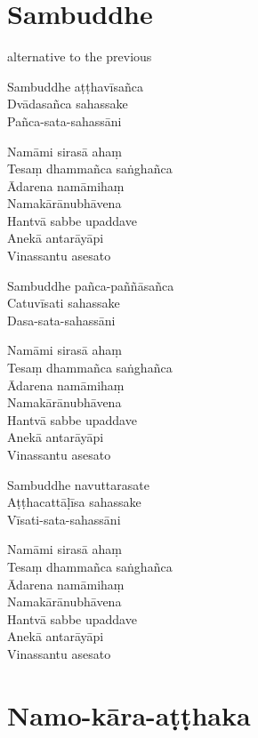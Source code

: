 \chapter{Sambuddhe}%

\begin{paritta}
\begin{instruction}
alternative to the previous
\end{instruction}

Sambuddhe aṭṭhavīsañca\\
Dvādasañca sahassake\\
Pañca-sata-sahassāni

Namāmi sirasā ahaṃ\\
Tesaṃ dhammañca saṅghañca\\
Ādarena namāmihaṃ\\
Namakārānubhāvena\\
Hantvā sabbe upaddave\\
Anekā antarāyāpi\\
Vinassantu asesato

\clearpage

Sambuddhe pañca-paññāsañca\\
Catuvīsati sahassake\\
Dasa-sata-sahassāni

Namāmi sirasā ahaṃ\\
Tesaṃ dhammañca saṅghañca\\
Ādarena namāmihaṃ\\
Namakārānubhāvena\\
Hantvā sabbe upaddave\\
Anekā antarāyāpi\\
Vinassantu asesato

Sambuddhe navuttarasate\\
Aṭṭhacattāḷīsa sahassake\\
Vīsati-sata-sahassāni

Namāmi sirasā ahaṃ\\
Tesaṃ dhammañca saṅghañca\\
Ādarena namāmihaṃ\\
Namakārānubhāvena\\
Hantvā sabbe upaddave\\
Anekā antarāyāpi\\
Vinassantu asesato
\end{paritta}

\clearpage

\chapter{Namo-kāra-aṭṭhaka}%

